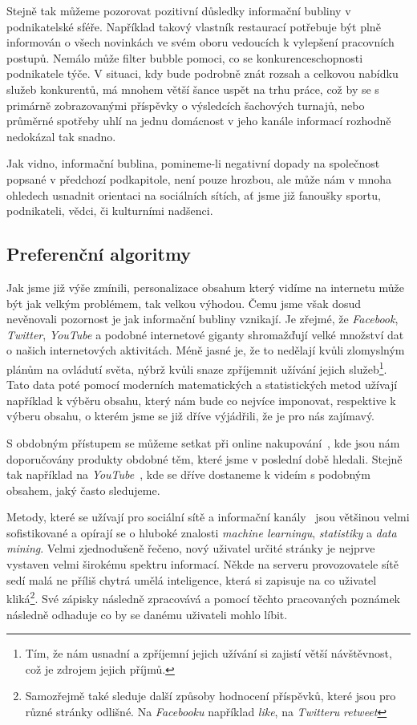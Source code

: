\documentclass[12pt, a4paper]{article}
\numberwithin{equation}{section} 	%
\begin{document}
Stejně tak můžeme pozorovat pozitivní důsledky informační bubliny v podnikatelské sféře. Například takový vlastník restaurací potřebuje být plně informován o všech novinkách ve svém oboru vedoucích k vylepšení pracovních postupů. Nemálo může filter bubble pomoci, co se konkurenceschopnosti podnikatele týče. V situaci, kdy bude podrobně znát rozsah a celkovou nabídku služeb konkurentů, má mnohem větší šance uspět na trhu práce, což by se s primárně zobrazovanými příspěvky o výsledcích šachových turnajů, nebo průměrné spotřeby uhlí na jednu domácnost v jeho kanále informací rozhodně nedokázal tak snadno.

Jak vidno, informační bublina, pomineme-li negativní dopady na společnost popsané v předchozí podkapitole, není pouze hrozbou, ale může nám v mnoha ohledech usnadnit orientaci na sociálních sítích, ať jsme již fanoušky sportu, podnikateli, vědci, či kulturními nadšenci.

\subsection{Preferenční algoritmy}
\noindent Jak jsme již výše zmínili, personalizace obsahum který vidíme na internetu může být jak velkým problémem, tak velkou výhodou. Čemu jsme však dosud nevěnovali pozornost je jak informační bubliny vznikají. Je zřejmé, že \textit{Facebook}, \textit{Twitter}, \textit{YouTube} a podobné internetové giganty shromažďují velké množství dat o našich internetových aktivitách. Méně jasné je, že to nedělají kvůli zlomyslným plánům na ovládutí světa, nýbrž kvůli snaze zpříjemnit užívání jejich služeb\footnote{Tím, že nám usnadní a zpříjemní jejich užívání si zajistí větší návštěvnost, což je zdrojem jejich příjmů.}. Tato data poté pomocí moderních matematických a statistických metod užívají například k výběru obsahu, který nám bude co nejvíce imponovat, respektive k výberu obsahu, o kterém jsme se již dříve výjádřili, že je pro nás zajímavý.

S obdobným přístupem se můžeme setkat při online nakupování~\cite{Amazon}, kde jsou nám doporučovány produkty obdobné těm, které jsme v poslední době hledali. Stejně tak například na \textit{YouTube}~\cite{YouTube}, kde se dříve dostaneme k videím s podobným obsahem, jaký často sledujeme.

Metody, které se užívají pro sociální sítě a informační kanály~\cite{TwitterRecomendation} jsou většinou velmi sofistikované a opírají se o hluboké znalosti \textit{machine learningu}, \textit{statistiky} a \textit{data mining}. Velmi zjednodušeně řečeno, nový uživatel určité stránky je nejprve vystaven velmi širokému spektru informací. Někde na serveru provozovatele sítě sedí malá ne příliš chytrá umělá inteligence, která si zapisuje na co uživatel kliká\footnote{Samozřejmě také sleduje další způsoby hodnocení příspěvků, které jsou pro různé stránky odlišné. Na \textit{Facebooku} například \textit{like}, na \textit{Twitteru} \textit{retweet}}. Své zápisky následně zpracovává a pomocí těchto pracovaných poznámek následně odhaduje co by se danému uživateli mohlo líbit.
\end{document}
